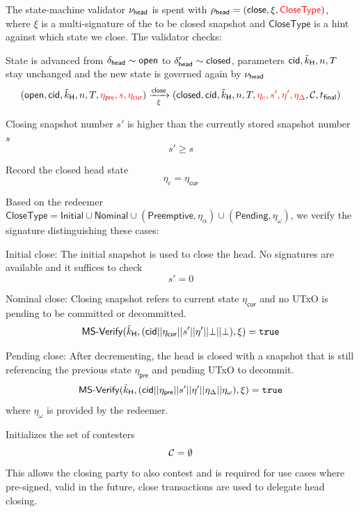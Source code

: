 \noindent The state-machine validator $\nu_\mathsf{head}$ is spent with
$\rho_{\mathsf{head}} = (\mathsf{close}, \xi, \textcolor{red}{\mathsf{CloseType}})$, where $\xi$ is a multi-signature of
the to be closed snapshot and $\mathsf{CloseType}$ is a hint against which state we close. The validator checks:
\begin{menumerate}
	\item State is advanced from $\delta_{\mathsf{head}} \sim \mathsf{open}$ to
	$\delta_{\mathsf{head}}' \sim \mathsf{closed}$, parameters $\mathsf{cid},\tilde{k}_{\mathsf{H}},n,T$
	stay unchanged and the new state is governed again by $\nu_\mathsf{head}$
	\[
		(\mathsf{open},\mathsf{cid},\tilde{k}_{\mathsf{H}},n,T,\textcolor{red}{\eta_{\mathsf{pre}},s,\eta_{\mathsf{cur}}}) \xrightarrow[\xi]{\mathsf{close}} (\mathsf{closed},\mathsf{cid},\tilde{k}_{\mathsf{H}},n,T,\textcolor{red}{\eta_{c},s',\eta',\eta_{\Delta}},\mathcal{C},t_{\mathsf{final}})
	\]

	\item Closing snapshot number $s'$ is higher than the currently stored snapshot number $s$
	\[
		s' \geq s
	\]
	\item Record the closed head state
	\[
	  \eta_{c} = \eta_{\mathsf{cur}}
	\]
	\item Based on the redeemer $\mathsf{CloseType} = \mathsf{Initial} \cup \mathsf{Nominal} \cup (\mathsf{Preemptive},\eta_{\alpha}) \cup (\mathsf{Pending}, \eta_{\omega})$, we verify the signature distinguishing these cases:
	\begin{menumerate}
	  \item Initial close: The initial snapshot is used to close the head. No signatures are available and it suffices to check
	  \[
		s' = 0
	  \]
	  \item Nominal close: Closing snapshot refers to current state $\eta_{\mathsf{cur}}$ and no UTxO is pending to be committed or decommitted.
	  \[
		\mathsf{MS\textsf{-}{}Verify}(\tilde{k}_{\mathsf{H}},(\mathsf{cid} || \eta_{\mathsf{cur}}|| s' || \eta' || \bot || \bot),\xi) = \mathtt{true}
	  \]
	  \item Pending close: After decrementing, the head is closed with a snapshot that is still referencing the previous state $\eta_{\mathsf{pre}}$ and pending UTxO to decommit.
	  \[
		\mathsf{MS\textsf{-}{}Verify}(\tilde{k}_{\mathsf{H}},(\mathsf{cid} || \eta_{\mathsf{pre}} || s' || \eta' || \eta_{\Delta} || \eta_{\omega}),\xi) = \mathtt{true}
	  \]
	  where $\eta_{\omega}$ is provided by the redeemer. 
	\end{menumerate}

	\item Initializes the set of contesters
	\[
		\mathcal{C} = \emptyset
	\]
	This allows the closing party to also contest and is required for use
	cases where pre-signed, valid in the future, close transactions are
	used to delegate head closing.


\end{menumerate}
